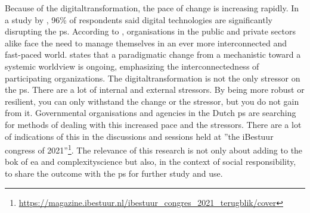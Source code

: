 Because of the \gls{digitaltransformation}, the pace of change is increasing rapidly. In a study by \textcite{Eggers2015}, 96\% of respondents said digital technologies are significantly disrupting the \gls{ps}. According to \textcite{Nurmi2021}, organisations in the public and private sectors alike face the need to manage themselves in an ever more interconnected and fast-paced world. \textcite{Guggenberger2020} states that a paradigmatic change from a mechanistic toward a systemic worldview is ongoing, emphasizing the interconnectedness of participating organizations. The \gls{digitaltransformation} is not the only \gls{stressor} on the \gls{ps}. There are a lot of internal and external \glspl{stressor}. By being more \gls{robust} or \gls{resilient}, you can only withstand the change or the \gls{stressor}, but you do not gain from it. Governmental organisations and agencies in the Dutch \gls{ps} are searching for methods of dealing with this increased pace and the stressors. There are a lot of indications of this in the discussions and sessions held at ''the iBestuur congress of 2021''\footnote{\url{https://magazine.ibestuur.nl/ibestuur_congres_2021_terugblik/cover}}. The relevance of this research is not only about adding to the \acrshort{bok} of \acrshort{ea} and \gls{complexityscience} but also, in the context of social responsibility, to share the outcome with the \gls{ps} for further study and use.